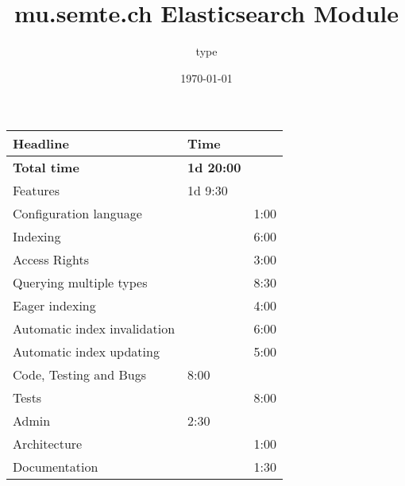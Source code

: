 \documentclass[11pt]{article}
\author{type}
\date{\today}
\title{mu.semte.ch Elasticsearch Module}
\begin{document}
\maketitle
\begin{center}
\begin{tabular}{llr}
Headline & Time & \\
\hline
\textbf{Total time} & \textbf{1d 20:00} & \\
\hline
Features & 1d 9:30 & \\
\hspace*{1em} Configuration language &  & 1:00\\
\hspace*{1em} Indexing &  & 6:00\\
\hspace*{1em} Access Rights &  & 3:00\\
\hspace*{1em} Querying multiple types &  & 8:30\\
\hspace*{1em} Eager indexing &  & 4:00\\
\hspace*{1em} Automatic index invalidation &  & 6:00\\
\hspace*{1em} Automatic index updating &  & 5:00\\
Code, Testing and Bugs & 8:00 & \\
\hspace*{1em} Tests &  & 8:00\\
Admin & 2:30 & \\
\hspace*{1em} Architecture &  & 1:00\\
\hspace*{1em} Documentation &  & 1:30\\
\end{tabular}
\end{center}
\end{document}
